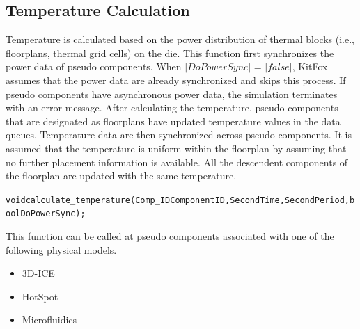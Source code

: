 \subsection{Temperature Calculation} \label{subsec:temperature_calculation}
\noindent
Temperature is calculated based on the power distribution of thermal blocks (i.e., floorplans, thermal grid cells) on the die. 
This function first synchronizes the power data of pseudo components. 
When $|DoPowerSync|$ = $|false|$, KitFox assumes that the power data are already synchronized and skips this process. 
If pseudo components have asynchronous power data, the simulation terminates with an error message. 
After calculating the temperature, pseudo components that are designated as floorplans have updated temperature values in the data queues. 
Temperature data are then synchronized across pseudo components. 
It is assumed that the temperature is uniform within the floorplan by assuming that no further placement information is available. 
All the descendent components of the floorplan are updated with the same temperature.
{
\fontsize{10pt}{11pt}\selectfont
\begin{alltt}
void calculate_temperature(Comp_ID ComponentID, Second Time, Second Period, bool DoPowerSync);
\end{alltt}
}
\noindent
This function can be called at pseudo components associated with one of the following physical models.
\begin{itemize}
\item{3D-ICE} \vspace*{-5pt}\leavevmode
\item{HotSpot} \vspace*{-5pt}\leavevmode
\item{Microfluidics}
\end{itemize}

